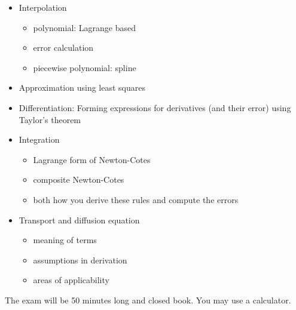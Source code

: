 \documentclass[12pt]{article}
\begin{document}
\begin{itemize}
\item Interpolation
  \begin{itemize}
  \item polynomial: Lagrange based
  \item error calculation
  \item piecewise polynomial: spline
  \end{itemize}

\item Approximation using least squares

\item Differentiation: Forming expressions for derivatives (and their error) using Taylor's theorem

\item Integration
  \begin{itemize}
  \item Lagrange form of Newton-Cotes
  \item composite Newton-Cotes
  \item both how you derive these rules and compute the errors
  \end{itemize}
  
\item Transport and diffusion equation
  \begin{itemize}
  \item meaning of terms
  \item assumptions in derivation
  \item areas of applicability
  \end{itemize}
\end{itemize}

The exam will be 50 minutes long and closed book. You may use a calculator.
\end{document}
